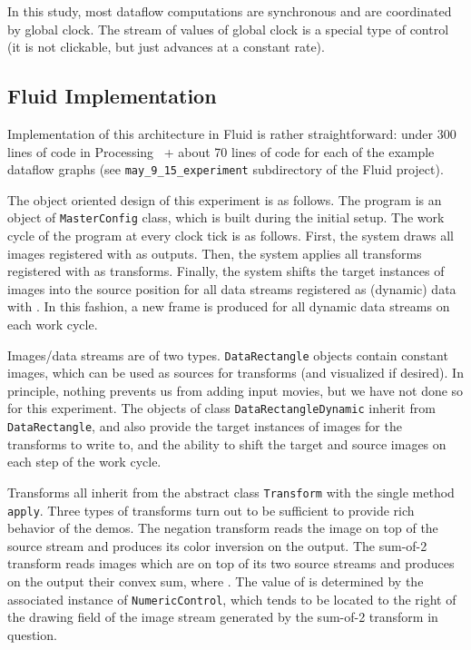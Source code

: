 \documentclass{llncs}
\begin{document}
In this study, most dataflow computations are synchronous and are coordinated by global clock.
The stream of values of global clock is a special type of control (it is not clickable, but just
advances at a constant rate).

\subsection{Fluid Implementation}\label{first_fluid}

Implementation of this architecture in Fluid is rather straightforward: under 300 lines of code in
Processing~\cite{Processing} + about 70 lines of code for each of
the example dataflow graphs (see {\tt may\_9\_15\_experiment} subdirectory of the Fluid project).

The object oriented design of this experiment is as follows. The program  is an object of {\tt MasterConfig} class,
which is built during the initial setup.
The work cycle of the program at every clock tick is as follows. First, the system draws
all images registered with  as outputs. Then, the system applies all
transforms registered with  as transforms. Finally, the system shifts the target instances of images
into the source  position for all data streams registered as (dynamic) data with . In this fashion,
a new frame is produced for all dynamic data streams on each work cycle.

Images/data streams are of two types. {\tt DataRectangle} objects contain constant images, which can
be used as sources for transforms (and visualized if desired). In principle, nothing prevents us
from adding input movies, but we have not done so for this experiment. The objects of class {\tt  DataRectangleDynamic}
inherit from {\tt DataRectangle}, and also provide the target instances of images for the transforms to write to, and
the ability to shift the target and source images on each step of the work cycle.

Transforms all inherit from the abstract class {\tt Transform} with the single method {\tt apply}.
Three types of transforms turn out to be sufficient to provide rich behavior of the demos.
The negation transform reads the image on top of the source stream and produces its color inversion on the output.
The sum-of-2 transform reads images which are on top of its two source streams and
produces on the output their convex sum,  where . The value of  is determined
by the associated instance of {\tt NumericControl}, which tends to be located to the right
of the drawing field of the image stream generated by the sum-of-2 transform in question.
\end{document}

